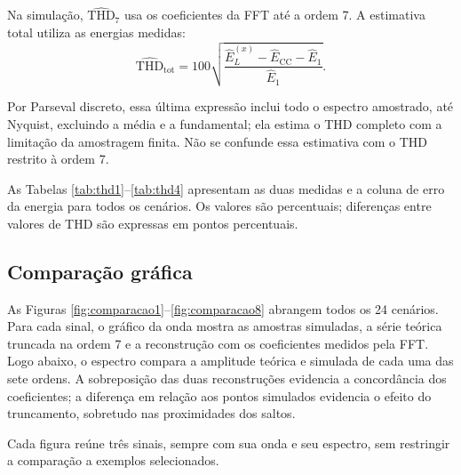 Na simulação, $\widehat{\mathrm{THD}}_7$ usa os coeficientes da
FFT até a ordem 7. A estimativa total utiliza as energias medidas:
\begin{equation}
    \widehat{\mathrm{THD}}_{\mathrm{tot}}
        =100\sqrt{\frac{\widehat E_L^{(x)}-\widehat E_{\mathrm{CC}}-\widehat E_1}
            {\widehat E_1}}.
\end{equation}

Por Parseval discreto, essa última expressão inclui todo o
espectro amostrado, até Nyquist, excluindo a média e a fundamental;
ela estima o THD completo com a limitação da amostragem finita.
Não se confunde essa estimativa com o THD restrito à ordem 7.

As Tabelas \ref{tab:thd1}--\ref{tab:thd4} apresentam as duas
medidas e a coluna de erro da energia para todos os cenários.
Os valores são percentuais; diferenças entre valores de THD
são expressas em pontos percentuais.


\subsection{Comparação gráfica}
As Figuras \ref{fig:comparacao1}--\ref{fig:comparacao8} abrangem
todos os 24 cenários. Para cada sinal, o gráfico da onda mostra
as amostras simuladas, a série teórica truncada na ordem 7 e a
reconstrução com os coeficientes medidos pela FFT. Logo abaixo,
o espectro compara a amplitude teórica e simulada de cada uma
das sete ordens. A sobreposição
das duas reconstruções evidencia a concordância dos coeficientes;
a diferença em relação aos pontos simulados evidencia o efeito
do truncamento, sobretudo nas proximidades dos saltos.

Cada figura reúne três sinais, sempre com sua onda e seu espectro,
sem restringir a comparação a exemplos selecionados.

\FloatBarrier

